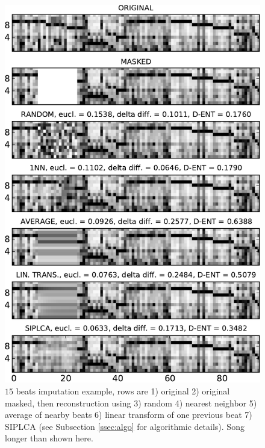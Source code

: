 \documentclass{article}
\begin{document}
\begin{figure}[t]
\begin{center}
\includegraphics[width=.99\columnwidth]{basic2}
\end{center}
\caption{$15$ beats imputation example, rows are 1) original 2) original masked,
then reconstruction using 3) random 4) nearest neighbor 5) average of nearby beats
6) linear transform of one previous beat 7) SIPLCA (see Subsection \ref{ssec:algo}
for algorithmic details). Song longer than shown here.
\label{fig:basic}}
\end{figure}

\end{document}
